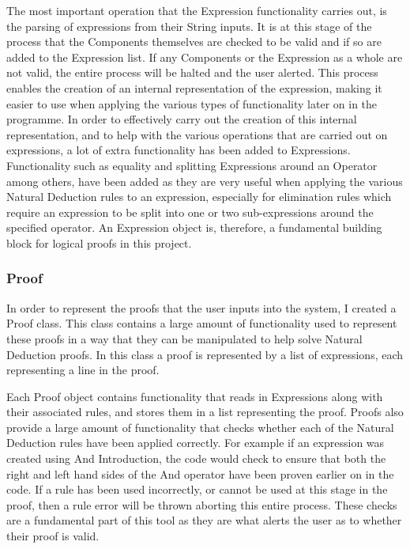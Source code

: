 The most important operation that the Expression functionality carries out, is the parsing of expressions from their String inputs. It is at this stage of the process that the Components themselves are checked to be valid and if so are added to the Expression list. If any Components or the Expression as a whole are not valid, the entire process will be halted and the user alerted. This process enables the creation of an internal representation of the expression, making it easier to use when applying the various types of functionality later on in the programme. In order to effectively carry out the creation of this internal representation, and to help with the various operations that are carried out on expressions, a lot of extra functionality has been added to Expressions. Functionality such as equality and splitting Expressions around an Operator among others, have been added as they are very useful when applying the various Natural Deduction rules to an expression, especially for elimination rules which require an expression to be split into one or two sub-expressions around the specified operator. An Expression object is, therefore, a fundamental building block for logical proofs in this project.

\subsubsection{Proof}

In order to represent the proofs that the user inputs into the system, I created a Proof class. This class contains a large amount of functionality used to represent these proofs in a way that they can be manipulated to help solve Natural Deduction proofs. In this class a proof is represented by a list of expressions, each representing a line in the proof. 

Each Proof object contains functionality that reads in Expressions along with their associated rules, and stores them in a list representing the proof. Proofs also provide a large amount of functionality that checks whether each of the Natural Deduction rules have been applied correctly.  For example if an expression was created using And Introduction, the code would check to ensure that both the right and left hand sides of the And operator have been proven earlier on in the code. If a rule has been used incorrectly, or cannot be used at this stage in the proof, then a rule error will be thrown aborting this entire process. These checks are a fundamental part of this tool as they are what alerts the user as to whether their proof is valid. 

